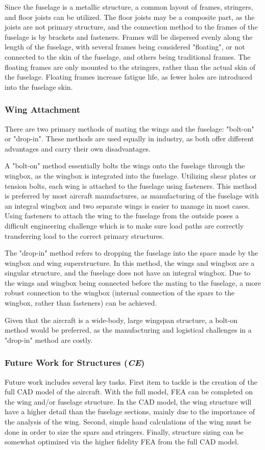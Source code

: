 Since the fuselage is a metallic structure, a common layout of frames, stringers, and floor joists can be utilized. The floor joists may be a composite part, as the joists are not primary structure, and the connection method to the frames of the fuselage is by brackets and fasteners. Frames will be dispersed evenly along the length of the fuselage, with several frames being considered "floating", or not connected to the skin of the fuselage, and others being traditional frames. The floating frames are only mounted to the stringers, rather than the actual skin of the fuselage. Floating frames increase fatigue life, as fewer holes are introduced into the fuselage skin.

\subsubsection{Wing Attachment}
There are two primary methods of mating the wings and the fuselage: "bolt-on" or "drop-in". These methods are used equally in industry, as both offer different advantages and carry their own disadvantages. 

A "bolt-on" method essentially bolts the wings onto the fuselage through the wingbox, as the wingbox is integrated into the fuselage. Utilizing shear plates or tension bolts, each wing is attached to the fuselage using fasteners. This method is preferred by most aircraft manufactures, as manufacturing of the fuselage with an integral wingbox and two separate wings is easier to manage in most cases. Using fasteners to attach the wing to the fuselage from the outside poses a difficult engineering challenge which is to make sure load paths are correctly transferring load to the correct primary structures.

The "drop-in" method refers to dropping the fuselage into the space made by the wingbox and wing superstructure. In this method, the wings and wingbox are a singular structure, and the fuselage does not have an integral wingbox. Due to the wings and wingbox being connected before the mating to the fuselage, a more robust connection to the wingbox (internal connection of the spars to the wingbox, rather than fasteners) can be achieved. 

Given that the aircraft is a wide-body, large wingspan structure, a bolt-on method would be preferred, as the manufacturing and logistical challenges in a "drop-in" method are costly.

\subsubsection{Future Work for Structures (\textit{CE})}
Future work includes several key tasks. First item to tackle is the creation of the full CAD model of the aircraft. With the full model, FEA can be completed on the wing and/or fuselage structure. In the CAD model, the wing structure will have a higher detail than the fuselage sections, mainly due to the importance of the analysis of the wing. Second, simple hand calculations of the wing must be done in order to size the spars and stringers. Finally, structure sizing can be somewhat optimized via the higher fidelity FEA from the full CAD model.


